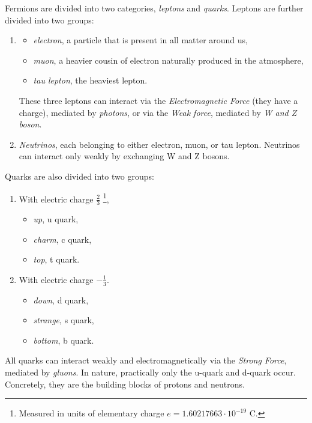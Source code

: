 Fermions are divided into two categories, \emph{leptons} and \emph{quarks}. 
Leptons are further divided into two groups:
\begin{enumerate}
    \item  
    \begin{itemize}
        \item \emph{electron}, a particle that is present in all matter around us,
        \item \emph{muon}, a heavier cousin of electron naturally produced in the atmosphere,
        \item \emph{tau lepton}, the heaviest lepton.
    \end{itemize}
    These three leptons can interact via the \emph{Electromagnetic Force} (they have a charge), mediated by \emph{photons}, or via the \emph{Weak force}, mediated by \emph{W and Z boson}. 
    \item \emph{Neutrinos}, each belonging to either electron, muon, or tau lepton.  
    Neutrinos can interact only weakly by exchanging W and Z bosons.
\end{enumerate}
Quarks are also divided into two groups:
\begin{multicols}{2}
\begin{enumerate}
    \item  
    With electric charge $\frac{2}{3}$ \footnote{Measured in units of elementary charge $e=1.60217663\cdot10^{-19}$ C.},
    \begin{itemize}
        \item \emph{up}, u quark,
        \item \emph{charm}, c quark,
        \item \emph{top}, t quark.
    \end{itemize}
    \item  
    With electric charge $-\frac{1}{3}$.
    \begin{itemize}
        \item \emph{down}, d quark,
        \item \emph{strange}, s quark,
        \item \emph{bottom}, b quark.
    \end{itemize}
\end{enumerate}
\end{multicols}
All quarks can interact  weakly and electromagnetically  via the \emph{Strong Force}, mediated by \emph{gluons}.
In nature, practically only the u-quark and d-quark occur. 
Concretely, they are the building blocks of protons and neutrons.

